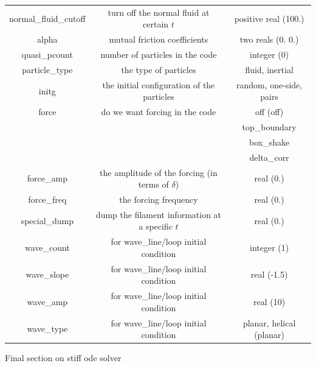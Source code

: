\documentclass[12pt]{article}
\begin{document}
\begin{flushleft}
\begin{tabular}{|c|c|c|}
normal\_fluid\_cutoff & turn off the normal fluid at certain $t$ & positive real (100.) \\
alpha & mutual friction coefficients & two reals (0. 0.) \\
quasi\_pcount & number of particles in the code & integer (0) \\
particle\_type & the type of particles & fluid, inertial \\
initg & the initial configuration of the particles & random, one-side, pairs\\
force & do we want forcing in the code & off (off)\\
                 &                           & top\_boundary \\
                 &                           & box\_shake \\
                 &                           & delta\_corr \\
force\_amp & the amplitude of the forcing (in terms of $\delta$)& real (0.)\\
force\_freq & the forcing frequency & real (0.)\\
special\_dump & dump the filament information at a specific $t$& real (0.)\\
wave\_count & for wave\_line/loop initial condition & integer (1)\\
wave\_slope & for wave\_line/loop initial condition & real (-1.5)\\
wave\_amp & for wave\_line/loop initial condition & real (10)\\
wave\_type & for wave\_line/loop initial condition & planar, helical (planar)\\
    \hline
\end{tabular}
\end{flushleft}
Final section on stiff ode solver
\end{document}
